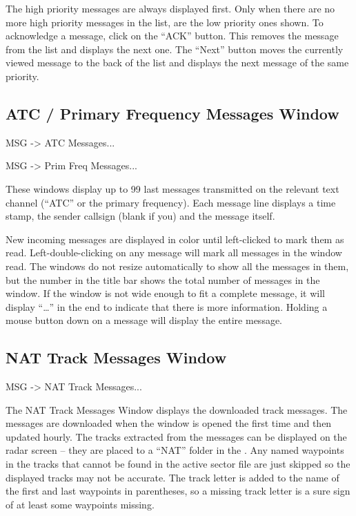 \documentclass[a4paper,oneside,11pt]{memoir}
\begin{document}
The high priority messages are always displayed first. Only when there are no more high priority messages in the list, are the low priority ones shown. To acknowledge a message, click on the “ACK” button. This removes the message from the list and displays the next one. The “Next” button moves the currently viewed message to the back of the list and displays the next message of the same priority.

\subsection{ATC / Primary Frequency Messages Window}
\label{win:atcmw}
\label{win:pfmw}

 MSG -> ATC Messages...

 MSG -> Prim Freq Messages...

\bigskip


These windows display up to 99 last messages transmitted on the relevant text channel (“ATC” or the primary frequency). Each message line displays a time stamp, the sender callsign (blank if you) and the message itself.

\bigskip

New incoming messages are displayed in  color until left-clicked to mark them as read. Left-double-clicking on any message will mark all messages in the window read. The windows do not resize automatically to show all the messages in them, but the number in the title bar shows the total number of messages in the window. If the window is not wide enough to fit a complete message, it will display “…” in the end to indicate that there is more information. Holding a mouse button down on a message will display the entire message.

\subsection{NAT Track Messages Window}
\label{win:nattmw}

 MSG -> NAT Track Messages...

\bigskip


The NAT Track Messages Window displays the downloaded track messages. The messages are downloaded when the window is opened the first time and then updated hourly. The tracks extracted from the messages can be displayed on the radar screen – they are placed to a “NAT” folder in the . Any named waypoints in the tracks that cannot be found in the active sector file are just skipped so the displayed tracks may not be accurate. The track letter is added to the name of the first and last waypoints in parentheses, so a missing track letter is a sure sign of at least some waypoints missing.
\end{document}
